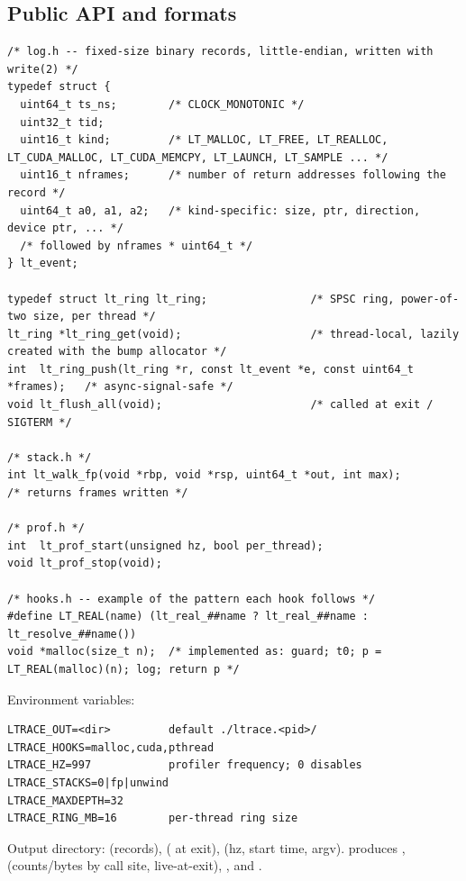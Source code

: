 \subsection{Public API and formats}

\begin{lstlisting}[style=c]
/* log.h -- fixed-size binary records, little-endian, written with write(2) */
typedef struct {
  uint64_t ts_ns;        /* CLOCK_MONOTONIC */
  uint32_t tid;
  uint16_t kind;         /* LT_MALLOC, LT_FREE, LT_REALLOC, LT_CUDA_MALLOC, LT_CUDA_MEMCPY, LT_LAUNCH, LT_SAMPLE ... */
  uint16_t nframes;      /* number of return addresses following the record */
  uint64_t a0, a1, a2;   /* kind-specific: size, ptr, direction, device ptr, ... */
  /* followed by nframes * uint64_t */
} lt_event;

typedef struct lt_ring lt_ring;                /* SPSC ring, power-of-two size, per thread */
lt_ring *lt_ring_get(void);                    /* thread-local, lazily created with the bump allocator */
int  lt_ring_push(lt_ring *r, const lt_event *e, const uint64_t *frames);   /* async-signal-safe */
void lt_flush_all(void);                       /* called at exit / SIGTERM */

/* stack.h */
int lt_walk_fp(void *rbp, void *rsp, uint64_t *out, int max);          /* returns frames written */

/* prof.h */
int  lt_prof_start(unsigned hz, bool per_thread);
void lt_prof_stop(void);

/* hooks.h -- example of the pattern each hook follows */
#define LT_REAL(name) (lt_real_##name ? lt_real_##name : lt_resolve_##name())
void *malloc(size_t n);  /* implemented as: guard; t0; p = LT_REAL(malloc)(n); log; return p */
\end{lstlisting}

Environment variables:
\begin{lstlisting}[style=plain]
LTRACE_OUT=<dir>         default ./ltrace.<pid>/
LTRACE_HOOKS=malloc,cuda,pthread
LTRACE_HZ=997            profiler frequency; 0 disables
LTRACE_STACKS=0|fp|unwind
LTRACE_MAXDEPTH=32
LTRACE_RING_MB=16        per-thread ring size
\end{lstlisting}

Output directory:  (records),  ( at exit),  (hz, start time, argv).  produces ,  (counts/bytes by call site, live-at-exit), , and .

